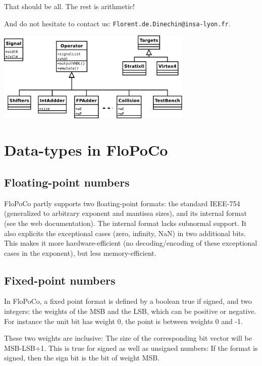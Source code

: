 \documentclass{article}
\begin{document}
That should be all. The rest is arithmetic!

And do not hesitate to contact us: \texttt{Florent.de.Dinechin@insa-lyon.fr}.

\begin{center}
  \includegraphics[width=0.7\textwidth]{../Figures/FloPoCoClasses.pdf}        
\end{center}


\section{Data-types in FloPoCo\label{sec:data-types}}

\subsection{Floating-point numbers}

FloPoCo partly supports two floating-point formats: the standard IEEE-754 (generalized to arbitrary exponent and mantissa sizes), and its internal format (see the web documentation).
The internal format lacks subnormal support.
It also explicits the exceptional cases (zero, infinity, NaN) in two additional bits.
This makes it more hardware-efficient (no decoding/encoding of these exceptional cases in the exponent), but less memory-efficient.

\subsection{Fixed-point numbers}
In FloPoCo, a fixed point format is defined by a boolean true if signed, and two integers: the weights of the MSB and the LSB, which can be positive or negative. 
For instance the unit bit has weight 0, the point is between weights 0 and -1. 

These two weights are inclusive: The size of the corresponding bit vector will be MSB-LSB+1.
This is true for signed as well as unsigned numbers: If the format is signed, then the sign bit is the bit of weight MSB.
\end{document}
